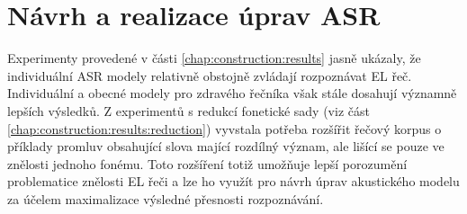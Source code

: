 \chapter{Návrh a realizace úprav ASR}
\label{chap:realisation}

Experimenty provedené v části \ref{chap:construction:results} jasně ukázaly, že individuální ASR modely relativně obstojně zvládají rozpoznávat EL řeč.
Individuální a obecné modely pro zdravého řečníka však stále dosahují významně lepších výsledků.
Z experimentů s redukcí fonetické sady (viz část \ref{chap:construction:results:reduction}) vyvstala potřeba rozšířit řečový korpus o příklady promluv obsahující slova mající rozdílný význam, ale lišící se pouze ve znělosti jednoho fonému.
Toto rozšíření totiž umožňuje lepší porozumění problematice znělosti EL řeči a lze ho využít pro návrh úprav akustického modelu za účelem maximalizace výsledné přesnosti rozpoznávání.










